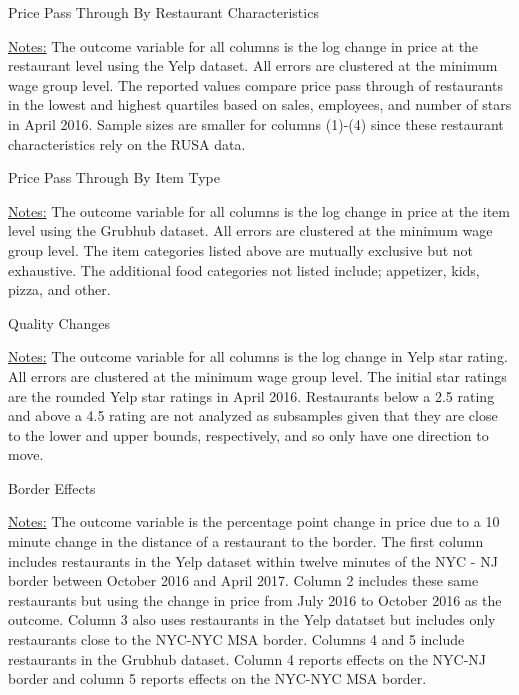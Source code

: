 \documentclass[11pt]{article}
\begin{document}
\begin{table}
\centering
\caption{Price Pass Through By Restaurant Characteristics}

{\footnotesize \raggedright \underline{Notes:} 
The outcome variable for all columns is the log change in price at the restaurant level using the Yelp dataset. All errors are clustered at the minimum wage group level. The reported values compare price pass through of restaurants in the lowest and highest quartiles based on sales, employees, and number of stars in April 2016. Sample sizes are smaller for columns (1)-(4) since these restaurant characteristics rely on the RUSA data. \par
}
\end{table}

\begin{landscape}
\begin{table}
\centering
\caption{Price Pass Through By Item Type}

{\footnotesize \raggedright \underline{Notes:} 
The outcome variable for all columns is the log change in price at the item level using the Grubhub dataset. All errors are clustered at the minimum wage group level. The item categories listed above are mutually exclusive but not exhaustive. The additional food categories not listed include; appetizer, kids, pizza, and other. \par
}
\end{table}
\end{landscape}



\begin{table}
\centering
\caption{Quality Changes}

{\footnotesize \raggedright \underline{Notes:} 
The outcome variable for all columns is the log change in Yelp star rating. All errors are clustered at the minimum wage group level. The initial star ratings are the rounded Yelp star ratings in April 2016. Restaurants below a 2.5 rating and above a 4.5 rating are not analyzed as subsamples given that they are close to the lower and upper bounds, respectively, and so only have one direction to move. \par
}
\end{table}

\begin{table}[H]
\centering
\caption{Border Effects}

{\footnotesize \raggedright \underline{Notes:} 
The outcome variable is the percentage point change in price due to a 10 minute change in the distance of a restaurant to the border. The first column includes restaurants in the Yelp dataset within twelve minutes of the NYC - NJ border between October 2016 and April 2017. Column 2 includes these same restaurants but using the change in price from July 2016 to October 2016 as the outcome. Column 3 also uses restaurants in the Yelp datatset but includes only restaurants close to the NYC-NYC MSA border. Columns 4 and 5 include restaurants in the Grubhub dataset. Column 4 reports effects on the NYC-NJ border and column 5 reports effects on the NYC-NYC MSA border. \par
}
\end{table}
\end{document}
